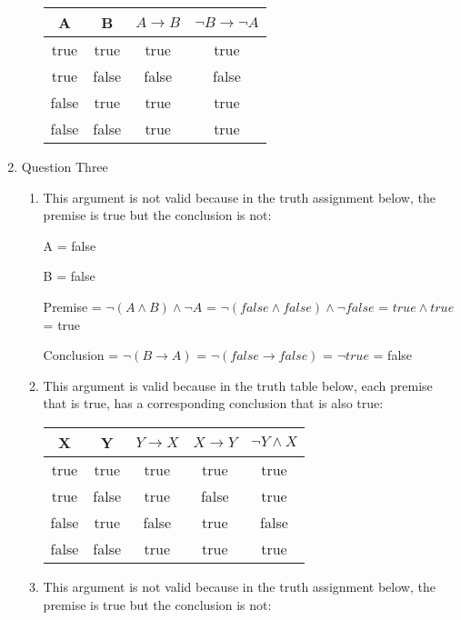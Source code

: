 \documentclass{article}
\begin{document}
\begin{enumerate}
\begin{enumerate}
        \begin{tabular}{| c | c | c | c |}
            \hline
            A & B & $A \rightarrow B$ & $\neg B \rightarrow \neg A$ \\
            \hline
            true & true & true & true \\
            \hline
            true & false & false & false \\
            \hline
            false & true & true & true \\
            \hline
            false & false & true & true \\
            \hline
        \end{tabular}
    \end{enumerate}
    \item Question Three
    \begin{enumerate}
        \item
        This argument is not valid because in the truth assignment below, the premise is true but the conclusion is not:
        
        A = false

        B = false

        Premise = $\neg (A \land B) \land \neg A$ = $\neg (false \land false) \land \neg false$ = $true \land true$ = true

        Conclusion = $\neg (B \rightarrow A)$ = $\neg (false \rightarrow false)$ = $\neg true$ = false
        \item This argument is valid because in the truth table below, each premise that is true, has a corresponding conclusion that is also true:
        
        \begin{tabular}{| c | c | c | c | c |}
            \hline
            X & Y & $Y \rightarrow X$ & $X \rightarrow Y$ & $\neg Y \land X$ \\
            \hline
            true & true & true & true & true \\
            \hline
            true & false & true & false & true \\
            \hline
            false & true & false & true & false \\
            \hline
            false & false & true & true & true \\
            \hline
        \end{tabular}
        \item
        This argument is not valid because in the truth assignment below, the premise is true but the conclusion is not:
        

\end{enumerate}
\end{enumerate}
\end{document}
